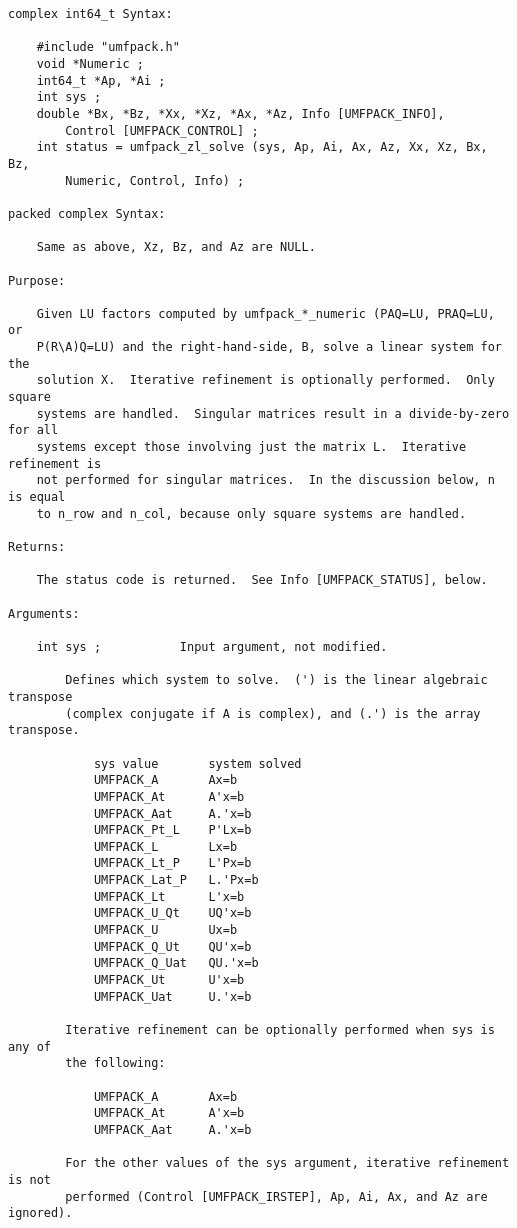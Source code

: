 \documentclass[11pt]{article}
\begin{document}
{\begin{verbatim}
complex int64_t Syntax:

    #include "umfpack.h"
    void *Numeric ;
    int64_t *Ap, *Ai ;
    int sys ;
    double *Bx, *Bz, *Xx, *Xz, *Ax, *Az, Info [UMFPACK_INFO],
        Control [UMFPACK_CONTROL] ;
    int status = umfpack_zl_solve (sys, Ap, Ai, Ax, Az, Xx, Xz, Bx, Bz,
        Numeric, Control, Info) ;

packed complex Syntax:

    Same as above, Xz, Bz, and Az are NULL.

Purpose:

    Given LU factors computed by umfpack_*_numeric (PAQ=LU, PRAQ=LU, or
    P(R\A)Q=LU) and the right-hand-side, B, solve a linear system for the
    solution X.  Iterative refinement is optionally performed.  Only square
    systems are handled.  Singular matrices result in a divide-by-zero for all
    systems except those involving just the matrix L.  Iterative refinement is
    not performed for singular matrices.  In the discussion below, n is equal
    to n_row and n_col, because only square systems are handled.

Returns:

    The status code is returned.  See Info [UMFPACK_STATUS], below.

Arguments:

    int sys ;           Input argument, not modified.

        Defines which system to solve.  (') is the linear algebraic transpose
        (complex conjugate if A is complex), and (.') is the array transpose.

            sys value       system solved
            UMFPACK_A       Ax=b
            UMFPACK_At      A'x=b
            UMFPACK_Aat     A.'x=b
            UMFPACK_Pt_L    P'Lx=b
            UMFPACK_L       Lx=b
            UMFPACK_Lt_P    L'Px=b
            UMFPACK_Lat_P   L.'Px=b
            UMFPACK_Lt      L'x=b
            UMFPACK_U_Qt    UQ'x=b
            UMFPACK_U       Ux=b
            UMFPACK_Q_Ut    QU'x=b
            UMFPACK_Q_Uat   QU.'x=b
            UMFPACK_Ut      U'x=b
            UMFPACK_Uat     U.'x=b

        Iterative refinement can be optionally performed when sys is any of
        the following:

            UMFPACK_A       Ax=b
            UMFPACK_At      A'x=b
            UMFPACK_Aat     A.'x=b

        For the other values of the sys argument, iterative refinement is not
        performed (Control [UMFPACK_IRSTEP], Ap, Ai, Ax, and Az are ignored).


\end{verbatim}}
\end{document}
